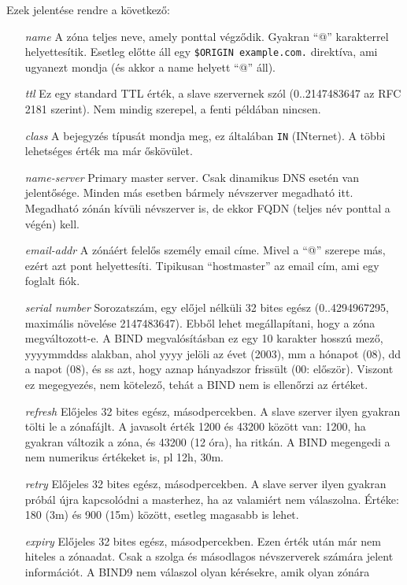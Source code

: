 \documentclass[fleqn,10pt,a4paper]{article}
\theoremstyle{magyar}
\begin{document}
  Ezek jelentése rendre a következő:
  \begin{enumerate}
  \item[ {\it name}] A zóna teljes neve, amely ponttal végződik. Gyakran ``@'' karakterrel helyettesítik. Esetleg
    előtte áll egy \texttt{\$ORIGIN example.com.} direktíva, ami ugyanezt mondja (és akkor a name helyett ``@'' áll).
  \item[ {\it ttl}] Ez egy standard TTL érték, a slave szervernek szól (0..2147483647 az RFC 2181 szerint). Nem mindig
    szerepel, a fenti példában nincsen.
  \item[ {\it class}]  A bejegyzés típusát mondja meg, ez általában \texttt{IN} (INternet). A többi lehetséges érték ma
    már őskövület.
  \item[ {\it name-server}] Primary master server. Csak dinamikus DNS esetén van jelentősége. Minden más esetben bármely
    névszerver megadható itt. Megadható zónán kívüli névszerver is, de ekkor FQDN (teljes név ponttal a végén) kell. 
  \item[ {\it email-addr}]  A zónáért felelős személy email címe. Mivel a ``@'' szerepe más, ezért azt pont
    helyettesíti. Tipikusan ``hostmaster'' az email cím, ami egy foglalt fiók.
  \item[ {\it serial number}] Sorozatszám, egy előjel nélküli 32 bites egész (0..4294967295, maximális növelése 2147483647).
    Ebből lehet megállapítani, hogy a zóna megváltozott-e. A BIND megvalósításban ez egy 10 karakter hosszú mező,
    yyyymmddss alakban, ahol yyyy jelöli az évet (2003), mm a hónapot (08), dd a napot (08), és ss azt, hogy aznap
    hányadszor frissült (00: először). Viszont ez megegyezés, nem kötelező, tehát a BIND nem is ellenőrzi az értéket.   
  \item[ {\it refresh}] Előjeles 32 bites egész, másodpercekben. A slave szerver ilyen gyakran tölti le a zónafájlt. A
    javasolt érték 1200 és 43200 között van: 1200, ha gyakran változik a zóna, és 43200 (12 óra), ha ritkán. A BIND
    megengedi a nem numerikus értékeket is, pl 12h, 30m.
  \item[ {\it retry}] Előjeles 32 bites egész, másodpercekben. A slave server ilyen gyakran próbál újra kapcsolódni a
    masterhez, ha az valamiért nem válaszolna. Értéke: 180 (3m) és 900 (15m) között, esetleg magasabb is lehet.
  \item[ {\it expiry}] Előjeles 32 bites egész, másodpercekben. Ezen érték után már nem hiteles a zónaadat. Csak a szolga
    és másodlagos névszerverek számára jelent információt. A BIND9 nem válaszol olyan kérésekre, amik olyan zónára

\end{enumerate}
\end{document}
